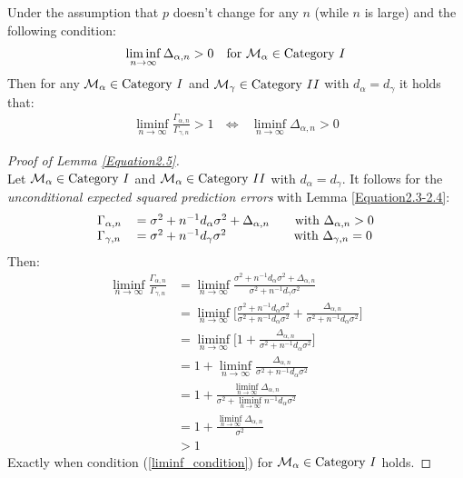 \documentclass[Research_Module_ES.tex]{subfiles}
\begin{document}
\begin{lemma}
	\label{Equation2.5}
	Under the assumption that $p$ doesn't change for any $n$ (while $n$ is large) and the following condition:
	\begin{align}
		\liminf_{n\rightarrow\infty}\Delta_{\alpha,n}>0 \text{~~~for~}\mathcal{M}_\alpha\in\text{Category}~\RM{1} \label{liminf_condition}
	\end{align}
	Then for any $\mathcal{M}_\alpha\in\text{Category}~\RM{1}$ and $\mathcal{M}_\gamma\in\text{Category}~\RM{2}$ with $d_\alpha=d_\gamma$ it holds that:
	\begin{align*}
		\liminf_{n\rightarrow\infty}\frac{\Gamma_{\alpha,n}}{\Gamma_{\gamma,n}}>1~~~\Leftrightarrow~~~\liminf_{n\rightarrow\infty}\Delta_{\alpha,n}>0
	\end{align*}
\end{lemma}

\begin{proof}[Proof of Lemma \ref{Equation2.5}]~\\
	Let $\mathcal{M}_\alpha\in\text{Category}~\RM{1}$ and $\mathcal{M}_\alpha\in\text{Category}~\RM{2}$ with $d_\alpha=d_\gamma$. It follows for the \textit{unconditional expected squared prediction errors} with Lemma \ref{Equation2.3-2.4}:
	\begin{align*}
	\begin{tabular}{ll}
	$\Gamma_{\alpha,n}$&$=\sigma^2+n^{-1}d_\alpha\sigma^2+\Delta_{\alpha,n}~~~~~$ with $\Delta_{\alpha,n}>0$\\
	$\Gamma_{\gamma,n}$&$=\sigma^2+n^{-1}d_\gamma\sigma^2~~~~~~~~~~~~~~~~$with $\Delta_{\gamma,n}=0$
	\end{tabular}
	\end{align*}
	Then:
	\begin{align*}
	\liminf_{n\rightarrow\infty}\frac{\Gamma_{\alpha,n}}{\Gamma_{\gamma,n}}&=\liminf_{n\rightarrow\infty}\frac{\sigma^2+n^{-1}d_\alpha\sigma^2+\Delta_{\alpha,n}}{\sigma^2+n^{-1}d_\gamma\sigma^2}	\\
	&=\liminf_{n\rightarrow\infty}\Big[\frac{\sigma^2+n^{-1}d_\alpha\sigma^2}{\sigma^2+n^{-1}d_\alpha\sigma^2}+\frac{\Delta_{\alpha,n}}{\sigma^2+n^{-1}d_\alpha\sigma^2}\Big]\\
	&=\liminf_{n\rightarrow\infty}\Big[1+\frac{\Delta_{\alpha,n}}{\sigma^2+n^{-1}d_\alpha\sigma^2}\Big]\\
	&=1+\liminf_{n\rightarrow\infty}\frac{\Delta_{\alpha,n}}{\sigma^2+n^{-1}d_\alpha\sigma^2}\\
	&=1+\frac{\liminf_{n\rightarrow\infty}\Delta_{\alpha,n}}{\sigma^2+ \liminf_{n\rightarrow\infty} n^{-1}d_\alpha\sigma^2}\\
	&=1+\frac{\liminf_{n\rightarrow\infty}\Delta_{\alpha,n}}{\sigma^2}\\
	&>1
	\end{align*}
	Exactly when condition (\ref{liminf_condition}) for $\mathcal{M}_\alpha\in\text{Category}~\RM{1}$ holds.
\end{proof}
\end{document}
